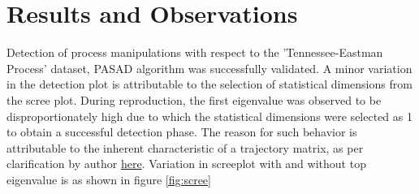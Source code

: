 \section*{Results and Observations}
Detection of process manipulations with respect to the 'Tennessee-Eastman Process' dataset, PASAD algorithm was successfully validated. A minor variation in the detection plot is attributable to the selection of statistical dimensions from the scree plot. During reproduction, the first eigenvalue was observed to be disproportionately high due to which the statistical dimensions were selected as 1 to obtain a successful detection phase. The reason for such behavior is attributable to the inherent characteristic of a trajectory matrix, as per clarification by author \href{https://github.com/mikeliturbe/pasad/issues/1}{here}. Variation in screeplot with and without top eigenvalue is as shown in figure \ref{fig:scree}

